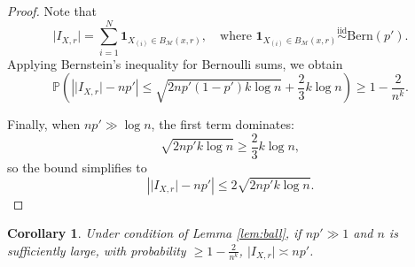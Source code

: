 \documentclass{article}
\newtheorem{cor}{Corollary}[theorem]
\begin{document}
\begin{proof}
Note that
\[
\lvert I_{X,r} \rvert = \sum_{i=1}^N \mathbf{1}_{X_{(i)} \in B_{\mathcal{M}}(x, r)},
\quad \text{where } \mathbf{1}_{X_{(i)} \in B_{\mathcal{M}}(x, r)} \overset{\text{iid}}{\sim} \mathrm{Bern}(p').
\]
Applying Bernstein’s inequality for Bernoulli sums, we obtain
\[
\mathbb{P}\left( \left| \lvert I_{X,r} \rvert - n p' \right| \le \sqrt{2 n p' (1 - p') k \log n} + \frac{2}{3} k \log n \right) \ge 1 - \frac{2}{n^k}.
\]

Finally, when \( n p' \gg \log n \), the first term dominates:
\[
\sqrt{2 n p' k \log n} \geq \frac{2}{3} k \log n,
\]
so the bound simplifies to
\[
\left| \lvert I_{X,r} \rvert - n p' \right| \leq  2\sqrt{2 n p' k \log n}.
\]
\end{proof}

\begin{cor}
Under condition of Lemma \ref{lem:ball}, if $np'\gg 1$ and $n$ is sufficiently large, 
with probability $\ge 1 - \frac{2}{n^k}$, $\lvert I_{X,r} \rvert \asymp n p'$.
\end{cor} 
\end{document}
